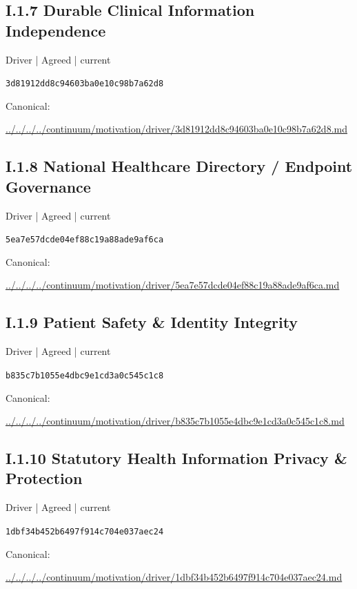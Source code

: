 \documentclass[10pt,a4paper]{article}
\begin{document}
\subsection*{I.1.7 Durable Clinical Information Independence}
\label{element-3d81912dd8c94603ba0e10c98b7a62d8}
{\small Driver | Agreed | current}\par
\texttt{3d81912dd8c94603ba0e10c98b7a62d8}\par
Canonical: \par
{\footnotesize\url{../../../../continuum/motivation/driver/3d81912dd8c94603ba0e10c98b7a62d8.md}}\par
\subsection*{I.1.8 National Healthcare Directory / Endpoint Governance}
\label{element-5ea7e57dcde04ef88c19a88ade9af6ca}
{\small Driver | Agreed | current}\par
\texttt{5ea7e57dcde04ef88c19a88ade9af6ca}\par
Canonical: \par
{\footnotesize\url{../../../../continuum/motivation/driver/5ea7e57dcde04ef88c19a88ade9af6ca.md}}\par
\subsection*{I.1.9 Patient Safety \& Identity Integrity}
\label{element-b835c7b1055e4dbc9e1cd3a0c545c1c8}
{\small Driver | Agreed | current}\par
\texttt{b835c7b1055e4dbc9e1cd3a0c545c1c8}\par
Canonical: \par
{\footnotesize\url{../../../../continuum/motivation/driver/b835c7b1055e4dbc9e1cd3a0c545c1c8.md}}\par
\subsection*{I.1.10 Statutory Health Information Privacy \& Protection}
\label{element-1dbf34b452b6497f914c704e037aec24}
{\small Driver | Agreed | current}\par
\texttt{1dbf34b452b6497f914c704e037aec24}\par
Canonical: \par
{\footnotesize\url{../../../../continuum/motivation/driver/1dbf34b452b6497f914c704e037aec24.md}}\par
\end{document}
